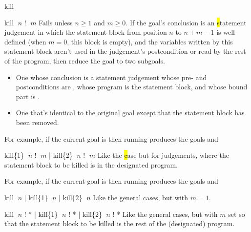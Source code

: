 \begin{tactic}{kill}
  \begin{tsyntax}{kill $\;n$ ! $\;m$}
    Fails unless $n\geq 1$ and $m\geq 0$.  If the goal's conclusion is
    an \hl statement judgement in which the statement block from
    position $n$ to $n + m - 1$ is well-defined (when $m = 0$, this
    block is empty), and the variables written by this statement
    block aren't used in the judgement's postcondition or read by the
    rest of the program, then reduce the goal to two subgoals.
    \begin{itemize}
    \item One whose conclusion is a \phl statement judgement whose pre-
       and postconditions are , whose program is the
       statement block, and whose bound part is .

    \item One that's identical to the original goal except that the
      statement block has been removed.
    \end{itemize}

    \medskip For example, if the current goal is
     then
    running 
    produces the goals
    and
  \end{tsyntax}

  \begin{tsyntax}{kill\{1\} $\;n$ ! $\;m$ | kill\{2\} $\;n$ ! $\;m$}
    Like the \hl case but for \prhl judgements, where the statement
    block to be killed is in the designated program.

    \medskip For example, if the current goal is
     then
    running 
    produces the goals
    and
  \end{tsyntax}

  \begin{tsyntax}{kill $\;n$ | kill\{1\} $\;n$ | kill\{2\} $\;n$}
    Like the general cases, but with $m = 1$.
  \end{tsyntax}

  \begin{tsyntax}{kill $\;n$ ! * | kill\{1\} $\;n$ ! * | kill\{2\} $\;n$ ! *}
    Like the general cases, but with $m$ set so that the statement
    block to be killed is the rest of the (designated) program.
  \end{tsyntax}
\end{tactic}
